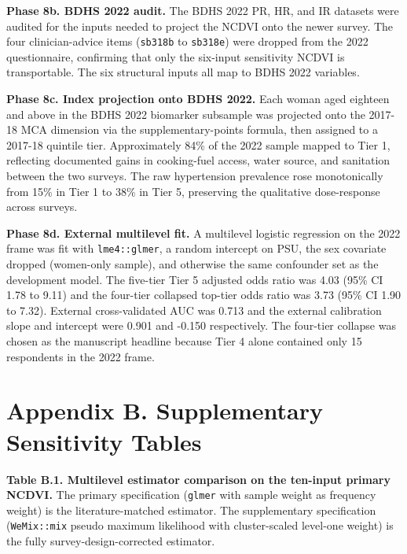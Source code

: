 \documentclass[
  12pt,
  a4paper]{article}
\begin{document}
\textbf{Phase 8b. BDHS 2022 audit.} The BDHS 2022 PR, HR, and IR datasets were audited for the inputs needed to project the NCDVI onto the newer survey. The four clinician-advice items (\texttt{sb318b} to \texttt{sb318e}) were dropped from the 2022 questionnaire, confirming that only the six-input sensitivity NCDVI is transportable. The six structural inputs all map to BDHS 2022 variables.

\textbf{Phase 8c. Index projection onto BDHS 2022.} Each woman aged eighteen and above in the BDHS 2022 biomarker subsample was projected onto the 2017-18 MCA dimension via the supplementary-points formula, then assigned to a 2017-18 quintile tier. Approximately 84\% of the 2022 sample mapped to Tier 1, reflecting documented gains in cooking-fuel access, water source, and sanitation between the two surveys. The raw hypertension prevalence rose monotonically from 15\% in Tier 1 to 38\% in Tier 5, preserving the qualitative dose-response across surveys.

\textbf{Phase 8d. External multilevel fit.} A multilevel logistic regression on the 2022 frame was fit with \texttt{lme4::glmer}, a random intercept on PSU, the sex covariate dropped (women-only sample), and otherwise the same confounder set as the development model. The five-tier Tier 5 adjusted odds ratio was 4.03 (95\% CI 1.78 to 9.11) and the four-tier collapsed top-tier odds ratio was 3.73 (95\% CI 1.90 to 7.32). External cross-validated AUC was 0.713 and the external calibration slope and intercept were 0.901 and -0.150 respectively. The four-tier collapse was chosen as the manuscript headline because Tier 4 alone contained only 15 respondents in the 2022 frame.

\section*{Appendix B. Supplementary Sensitivity Tables}\label{appendix-b.-supplementary-sensitivity-tables}

\textbf{Table B.1. Multilevel estimator comparison on the ten-input primary NCDVI.} The primary specification (\texttt{glmer} with sample weight as frequency weight) is the literature-matched estimator. The supplementary specification (\texttt{WeMix::mix} pseudo maximum likelihood with cluster-scaled level-one weight) is the fully survey-design-corrected estimator.
\end{document}
